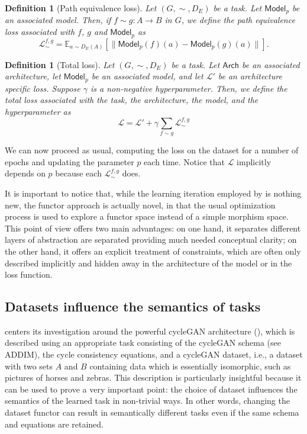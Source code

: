 \documentclass[11pt,a4paper,openright,twoside]{report}
\theoremstyle{plain}
\newtheorem{definition}[proposition]{Definition}
\theoremstyle{definition}
\begin{document}
\begin{definition}[Path equivalence loss]
  Let $(G,{\sim},D_E)$ be a task. Let $\mathsf{Model}_p$ be an associated model. Then, if $f \sim g: A \to B$ in $G$, we define the path equivalence loss associated with $f$, $g$ and $\mathsf{Model}_p$ as 
  \[\mathcal{L}_{\sim}^{f,g} = \mathbb{E}_{a \sim D_E(A)}[\|\mathsf{Model}_p(f)(a) - \mathsf{Model}_p(g)(a)\|].\]  
\end{definition}

\begin{definition}[Total loss]
  Let $(G,{\sim},D_E)$ be a task. Let $\mathsf{Arch}$ be an associated architecture, let $\mathsf{Model}_p$ be an associated model, and let $\mathcal{L}'$ be an architecture specific loss. Suppose $\gamma$ is a non-negative hyperparameter. Then, we define the total loss associated with the task, the architecture, the model, and the hyperparameter as
  \begin{equation}
    \label{eq: sumoflosses}
    \mathcal{L} = \mathcal{L}' + \gamma\sum_{f \sim g}\mathcal{L}_{\sim}^{f,g}
  \end{equation}
\end{definition}

We can now proceed as usual, computing the loss on the dataset for a number of epochs and updating the parameter $p$ each time. Notice that $\mathcal{L}$ implicitly depends on $p$ because each $\mathcal{L}_{\sim}^{f,g}$ does.

It is important to notice that, while the learning iteration employed by \cite{gavranovic2019compositional} is nothing new, the functor approach is actually novel, in that the usual optimization process is used to explore a functor space instead of a simple morphism space. This point of view offers two main advantages: on one hand, it separates different layers of abstraction are separated providing much needed conceptual clarity; on the other hand, it offers an explicit treatment of constraints, which are often only described implicitly and hidden away in the architecture of the model or in the loss function. 

\subsection{Datasets influence the semantics of tasks}

\cite{gavranovic2019compositional} centers its investigation around the powerful cycleGAN architecture (\cite{zhu2017unpaired}), which is described using an appropriate task consisting of the cycleGAN schema (see ADDIM), the cycle consistency equations, and a cycleGAN dataset, i.e., a dataset with two sets $A$ and $B$ containing data which is essentially isomorphic, such as pictures of horses and zebras. This description is particularly insightful because it can be used to prove a very important point: the choice of dataset influences the semantics of the learned task in non-trivial ways. In other words, changing the dataset functor can result in semantically different tasks even if the same schema and equations are retained. 
\end{document}

